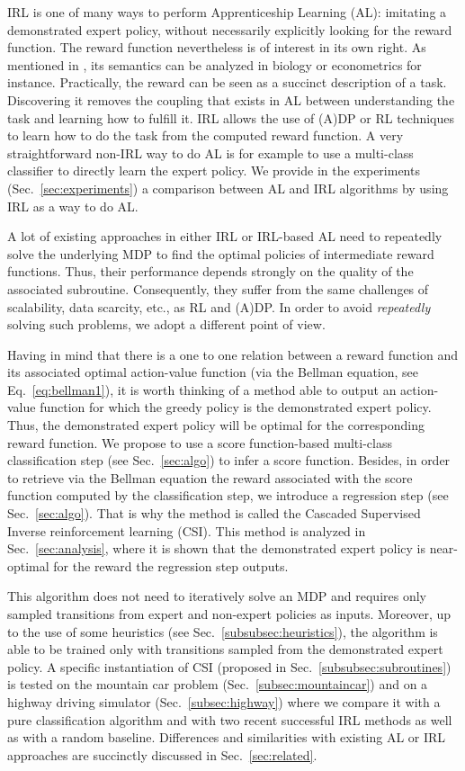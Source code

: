 \documentclass{llncs}
\begin{document}
IRL is one of many ways to perform Apprenticeship Learning (AL): imitating a demonstrated expert policy, without necessarily explicitly looking for the reward function. The reward function nevertheless is of interest in its own right. As mentioned in \cite{russell1998learning}, its semantics can be analyzed in biology or econometrics for instance. Practically, the reward can be seen as a succinct description of a task. Discovering it removes the coupling that exists in AL between understanding the task and learning how to fulfill it. IRL allows the use of (A)DP or RL techniques to learn how to do the task from the computed reward function. A very straightforward non-IRL way to do AL is for example to use a multi-class classifier to directly learn the expert policy. We provide in the experiments (Sec.~\ref{sec:experiments}) a comparison between AL and IRL algorithms by using IRL as a way to do AL.

A lot of existing approaches in either IRL or IRL-based AL need to repeatedly solve the underlying MDP to find the optimal policies of intermediate reward functions. Thus, their performance depends strongly on the quality of the associated subroutine. Consequently, they suffer from the same challenges of scalability, data scarcity, etc., as RL and (A)DP. In order to avoid \emph{repeatedly} solving such problems, we adopt a different point of view.

Having in mind that there is a one to one relation between a reward function and its associated optimal action-value function (via the Bellman equation, see Eq.~\eqref{eq:bellman1}), it is worth thinking of a method able to output an action-value function for which the greedy policy is the demonstrated expert policy. Thus, the demonstrated expert policy will be optimal for the corresponding reward function. We propose to use a score function-based multi-class classification step (see Sec.~\ref{sec:algo}) to infer a score function. Besides, in order to retrieve via the Bellman equation the reward associated with the score function computed by the classification step, we introduce a regression step (see Sec.~\ref{sec:algo}). That is why the method is called the Cascaded Supervised Inverse reinforcement learning (CSI). This method is analyzed in Sec.~\ref{sec:analysis}, where it is shown that the demonstrated expert policy is near-optimal for the reward the regression step outputs.

This algorithm does not need to iteratively solve an MDP and requires only sampled transitions from expert and non-expert policies as inputs. Moreover, up to the use of some heuristics (see Sec.~\ref{subsubsec:heuristics}), the algorithm is able to be trained only with transitions sampled from the demonstrated expert policy. A specific instantiation of CSI (proposed in Sec.~\ref{subsubsec:subroutines}) is tested on the mountain car problem (Sec.~\ref{subsec:mountaincar}) and on a highway driving simulator (Sec.~\ref{subsec:highway}) where we compare it with a pure classification algorithm \cite{taskar2005learning} and with two recent successful IRL methods \cite{klein2012scirl} as well as with a random baseline. Differences and similarities with existing AL or IRL approaches are succinctly discussed in Sec.~\ref{sec:related}.
\end{document}
